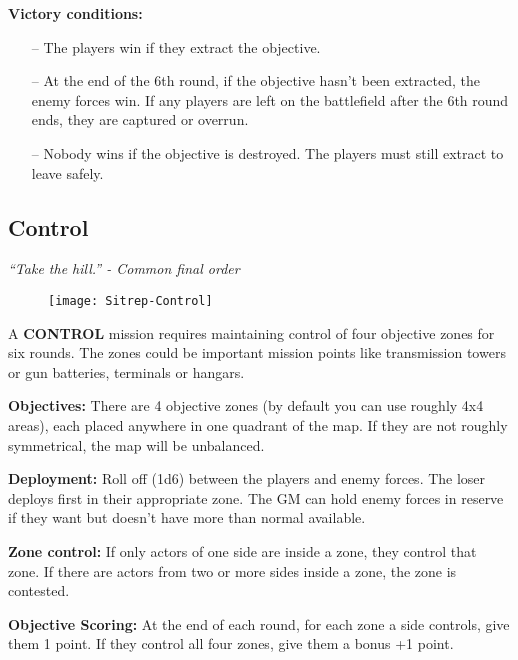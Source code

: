 \textbf{Victory conditions:}

\begin{itemize}
\item[--]The players win if they extract the objective.
\item[--]At the end of the 6th round, if the objective hasn’t been extracted, the enemy forces win. If any players are left on the battlefield after the 6th round ends, they are captured or overrun.
\item[--]Nobody wins if the objective is destroyed. The players must still extract to leave safely.
\end{itemize}

\subsection{Control}

\textit{“Take the hill.” - Common final order}

\begin{figure}\begin{center}
  \texttt{[image: Sitrep-Control]}
\end{center}\end{figure}

A \textbf{CONTROL} mission requires maintaining control of four objective zones for six rounds. The zones could be important mission points like transmission towers or gun batteries, terminals or hangars.

\textbf{Objectives:} There are 4 objective zones (by default you can use roughly 4x4 areas), each placed anywhere in one quadrant of the map. If they are not roughly symmetrical, the map will be unbalanced.

\textbf{Deployment:} Roll off (1d6) between the players and enemy forces. The loser deploys first in their appropriate zone. The GM can hold enemy forces in reserve if they want but doesn’t have more than normal available.

\textbf{Zone control:} If only actors of one side are inside a zone, they control that zone. If there are actors from two or more sides inside a zone, the zone is contested.

\textbf{Objective Scoring:} At the end of each round, for each zone a side controls, give them 1 point. If they control all four zones, give them a bonus +1 point.

